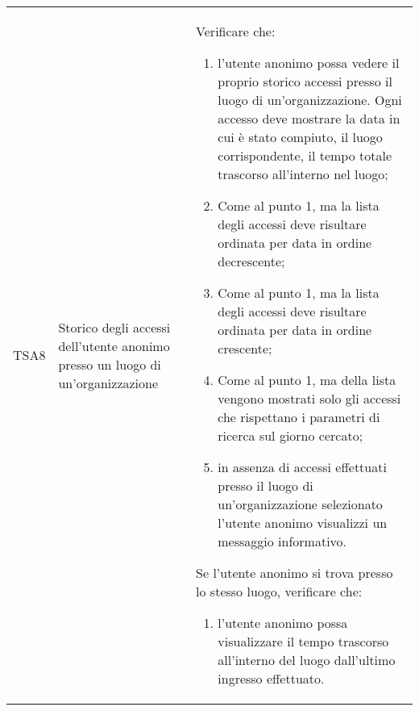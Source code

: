 {\begin{longtable}{ c | C{3cm} | C{11cm} }
TSA8 & Storico degli accessi dell'utente anonimo presso un luogo di un'organizzazione & 
Verificare che:    
\begin{enumerate}
    \item l'utente anonimo possa vedere il proprio storico accessi presso il luogo di un'organizzazione. Ogni accesso deve mostrare la data in cui è stato compiuto, il luogo corrispondente, il tempo totale trascorso all'interno nel luogo;
    \item Come al punto 1, ma la lista degli accessi deve risultare ordinata per data in ordine decrescente;
    \item Come al punto 1, ma la lista degli accessi deve risultare ordinata per data in ordine crescente;
    \item Come al punto 1, ma della lista vengono mostrati solo gli accessi che rispettano i parametri di ricerca sul giorno cercato;
    \item in assenza di accessi effettuati presso il luogo di un'organizzazione selezionato l'utente anonimo visualizzi un messaggio informativo.
\end{enumerate}
Se l'utente anonimo si trova presso lo stesso luogo, verificare che:
\begin{enumerate}
    \item l'utente anonimo possa visualizzare il tempo trascorso all'interno del luogo dall'ultimo ingresso effettuato.
\end{enumerate} \\


\end{longtable}}
